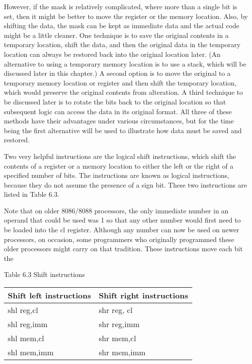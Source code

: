 \documentclass[10pt]{article}
\begin{document}
However, if the mask is relatively complicated, where more than a single bit is set, then it might be better to move the register or the memory location. Also, by shifting the data, the mask can be kept as immediate data and the actual code might be a little cleaner. One technique is to save the original contents in a temporary location, shift the data, and then the original data in the temporary location can always be restored back into the original location later. (An alternative to using a temporary memory location is to use a stack, which will be discussed later in this chapter.) A second option is to move the original to a temporary memory location or register and then shift the temporary location, which would preserve the original contents from alteration. A third technique to be discussed later is to rotate the bits back to the original location so that subsequent logic can access the data in its original format. All three of these methods have their advantages under various circumstances, but for the time being the first alternative will be used to illustrate how data must be saved and restored.

Two very helpful instructions are the logical shift instructions, which shift the contents of a register or a memory location to either the left or the right of a specified number of bits. The instructions are known as logical instructions, because they do not assume the presence of a sign bit. These two instructions are listed in Table 6.3.

Note that on older 8086/8088 processors, the only immediate number in an operand that could be used was 1 so that any other number would first need to be loaded into the cl register. Although any number can now be used on newer processors, on occasion, some programmers who originally programmed these older processors might carry on that tradition. These instructions move each bit the

Table 6.3 Shift instructions

\begin{center}
\begin{tabular}{|ll|}
\hline
Shift left instructions & Shift right instructions \\
\hline
shl reg,cl & shr reg, cl \\
shl reg,imm & shr reg,imm \\
shl mem,cl & shr mem,cl \\
shl mem,imm & shr mem,imm \\
\hline
\end{tabular}
\end{center}
\end{document}
